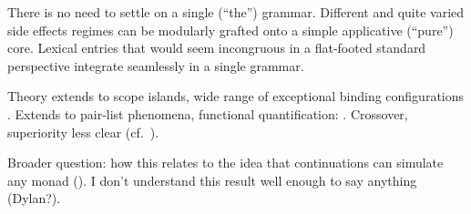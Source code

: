 	There is no need to settle on a single (``the'') grammar. Different and quite varied side effects regimes can be modularly grafted onto a simple applicative (``pure'') core. Lexical entries that would seem incongruous in a flat-footed standard perspective integrate seamlessly in a single grammar. %
	
	Theory extends to scope islands, wide range of exceptional binding configurations \citealt{Charlow:diss}. Extends to pair-list phenomena, functional quantification: \citealt{Bumford:inc}. Crossover, superiority less clear (cf.~\citealt{ShanBarker:2006, BarkerShan:2008}). %
	
	Broader question: how this relates to the idea that continuations can simulate any monad (\citealt{Filinski:1994}). I don't understand this result well enough to say anything (Dylan?). %

{\small}
